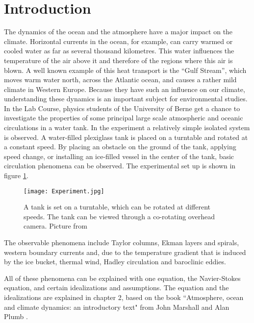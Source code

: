 \documentclass[12pt, a4paper]{article} %
\begin{document}
\newpage
\tableofcontents
\newpage
\listoffigures
\newpage


\section{Introduction}

	The dynamics of the ocean and the atmosphere have a major impact on the climate. Horizontal currents in the ocean, for example, can carry warmed or cooled water as far as several thousand kilometres. This water influences the temperature of the air above it and therefore of the regions where this air is blown. A well known example of this heat transport is the ``Gulf Stream'', which moves warm water north, across the Atlantic ocean, and causes a rather mild climate in Western Europe. Because they have such an influence on our climate, understanding these dynamics is an important subject for environmental studies. \\
	
	In the Lab Course, physics students of the University of Berne get a chance to investigate the properties of some principal large scale atmospheric and oceanic circulations in a water tank. In the experiment a relatively simple isolated system is observed. A water-filled plexiglass tank is placed on a turntable and rotated at a constant speed. By placing an obstacle on the ground of the tank, applying speed change, or installing an ice-filled vessel in the center of the tank, basic circulation phenomena can be observed. The experimental set up is shown in figure \ref{fig:Experiment}.

	\begin{figure}[H]
		\centering
		\captionsetup{width=0.9\textwidth}
		\texttt{[image: Experiment.jpg]}
		\caption[Experimental set-up]{A tank is set on a turntable, which can be rotated at different speeds. The tank can be viewed through a co-rotating overhead camera. Picture from \cite{Schneider}}
		\label{fig:Experiment}
	\end{figure}

	The observable phenomena include Taylor columns, Ekman layers and spirals, western boundary currents and, due to the temperature gradient that is induced by the ice bucket, thermal wind, Hadley circulation and baroclinic eddies.
	
	All of these phenomena can be explained with one equation, the Navier-Stokes equation, and certain idealizations and assumptions. The equation and the idealizations are explained in chapter 2, based on the book ``Atmosphere, ocean and climate dynamics: an introductory text" from John Marshall and Alan Plumb \cite{Marshall1965}.
	
\end{document}
